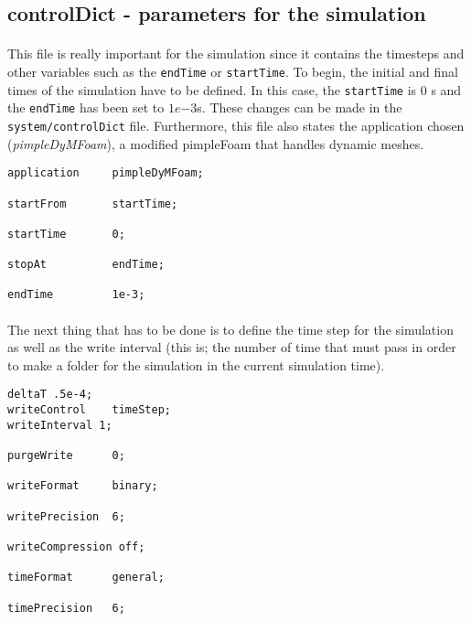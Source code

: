 \subsection{controlDict - parameters for the simulation}

\paragraph{}This file is really important for the simulation since it contains the timesteps and other variables such as the \texttt{endTime} or \texttt{startTime}. To begin, the initial and final times of the simulation have to be defined. In this case, the \texttt{startTime} is 0 s and the \texttt{endTime} has been set to $1e{-3}$s. These changes can be made in the \texttt{system/controlDict} file. Furthermore, this file also states the application chosen (\textit{pimpleDyMFoam}), a modified pimpleFoam that handles dynamic meshes.

\begin{footnotesize}
\begin{verbatim}
application     pimpleDyMFoam;

startFrom       startTime;

startTime       0;

stopAt          endTime;

endTime         1e-3;
\end{verbatim}
\end{footnotesize}

\paragraph{}The next thing that has to be done is to define the time step for the simulation as well as the write interval (this is; the number of time that must pass in order to make a folder for the simulation in the current simulation time). 

\begin{footnotesize}
\begin{verbatim}
deltaT .5e-4;
writeControl    timeStep;
writeInterval 1;

purgeWrite      0;

writeFormat     binary;

writePrecision  6;

writeCompression off;

timeFormat      general;

timePrecision   6;
\end{verbatim}
\end{footnotesize}

